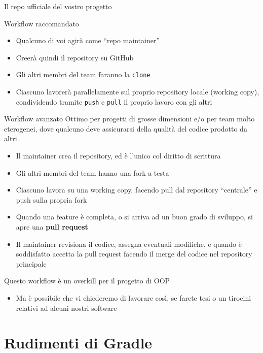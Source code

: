 \documentclass[presentation]{beamer}
\begin{document}
\begin{frame}[allowframebreaks]{Il repo ufficiale del vostro progetto}
	\begin{block}{Workflow raccomandato}
		\begin{itemize}
			\item Qualcuno di voi agirà come ``repo maintainer''
			\item Creerà quindi il repository su GitHub
			\item Gli altri membri del team faranno la \texttt{clone}
			\item Ciascuno lavorerà parallelamente sul proprio repository locale (working copy), condividendo tramite \texttt{push} e \texttt{pull} il proprio lavoro con gli altri
		\end{itemize}
	\end{block}
	\begin{block}{Workflow avanzato}
		Ottimo per progetti di grosse dimensioni e/o per team molto eterogenei, dove qualcuno deve assicurarsi della qualità del codice prodotto da altri.
		\begin{itemize}
			\item Il maintainer crea il repository, ed è l'unico col diritto di scrittura
			\item Gli altri membri del team hanno una fork a testa
			\item Ciascuno lavora su una working copy, facendo pull dal repository ``centrale'' e push sulla propria fork
			\item Quando una feature è completa, o si arriva ad un buon grado di sviluppo, si apre una \textbf{pull request}
			\item Il maintainer revisiona il codice, assegna eventuali modifiche, e quando è soddisfatto accetta la pull request facendo il merge del codice nel repository principale
		\end{itemize}
		Questo workflow è un overkill per il progetto di OOP
		\begin{itemize}
			\item Ma è possibile che vi chiederemo di lavorare così, se farete tesi o un tirocini relativi ad alcuni nostri software
		\end{itemize}
	\end{block}
\end{frame}

\section{Rudimenti di Gradle}
\end{document}
